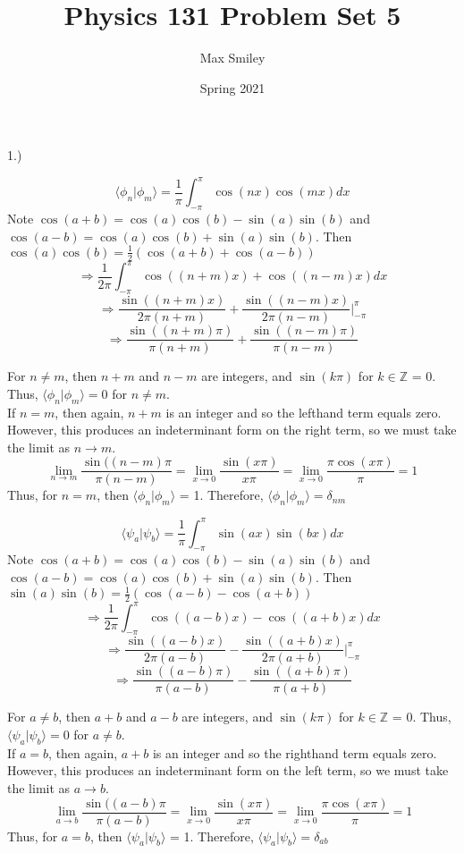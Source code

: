 \documentclass[12pt]{article}
\begin{document}
\title{Physics 131 Problem Set 5}
\author{Max Smiley}
\date{Spring 2021}
\maketitle

1.) 

$$\langle \phi_n | \phi_m \rangle = \frac{1}{\pi} \int_{-\pi}^{\pi} \cos(nx) \cos(mx) dx$$
Note $\cos(a + b) = \cos(a)\cos(b) - \sin(a)\sin(b)$ and $\cos(a - b) = \cos(a)\cos(b) + \sin(a)\sin(b)$. Then $\cos(a)\cos(b) = \frac{1}{2}(\cos(a + b) + \cos(a - b))$
$$\Rightarrow \frac{1}{2\pi} \int_{-\pi}^{\pi}\cos((n + m)x) + \cos((n - m)x)dx$$
$$\Rightarrow \frac{\sin((n + m)x)}{2\pi(n + m)} + \frac{\sin((n - m)x)}{2\pi(n - m)} \Big|_{-\pi}^{\pi}$$ 
$$\Rightarrow \frac{\sin((n + m)\pi)}{\pi (n + m)} + \frac{\sin((n - m)\pi)}{\pi (n - m)}$$

For $n \neq m$, then $n + m$ and $n - m$ are integers, and $\sin(k\pi)$ for $k \in \mathbb{Z}$ = 0. Thus, $\langle \phi_n | \phi_m \rangle = 0$ for $n \neq m$.\\

If $n = m$, then again, $n + m$ is an integer and so the lefthand term equals zero. However, this produces an indeterminant form on the right term, so we must take the limit as $n \rightarrow m$.
$$\lim_{n \rightarrow m} \frac{\sin((n - m) \pi}{\pi (n - m)} = \lim_{x \rightarrow 0} \frac{\sin(x\pi)}{x\pi} = \lim_{x \rightarrow 0} \frac{\pi \cos(x\pi)}{\pi} = 1$$
Thus, for $n = m$, then $\langle \phi_n | \phi_m \rangle$ = 1. Therefore, $\langle \phi_n | \phi_m \rangle = \delta_{nm}$

$$\langle \psi_a | \psi_b \rangle = \frac{1}{\pi} \int_{-\pi}^{\pi} \sin(ax) \sin(bx) dx$$
Note $\cos(a + b) = \cos(a)\cos(b) - \sin(a)\sin(b)$ and $\cos(a - b) = \cos(a)\cos(b) + \sin(a)\sin(b)$. Then $\sin(a)\sin(b) = \frac{1}{2}(\cos(a - b) - \cos(a + b))$
$$\Rightarrow \frac{1}{2\pi} \int_{-\pi}^{\pi}\cos((a - b)x) - \cos((a + b)x)dx$$
$$\Rightarrow \frac{\sin((a - b)x)}{2\pi(a - b)} - \frac{\sin((a + b)x)}{2\pi(a + b)} \Big|_{-\pi}^{\pi}$$ 
$$\Rightarrow \frac{\sin((a - b)\pi)}{\pi (a - b)} - \frac{\sin((a + b)\pi)}{\pi (a + b)}$$

For $a \neq b$, then $a + b$ and $a - b$ are integers, and $\sin(k\pi)$ for $k \in \mathbb{Z}$ = 0. Thus, $\langle \psi_a | \psi_b \rangle = 0$ for $a \neq b$.\\

If $a = b$, then again, $a + b$ is an integer and so the righthand term equals zero. However, this produces an indeterminant form on the left term, so we must take the limit as $a \rightarrow b$.
$$\lim_{a \rightarrow b} \frac{\sin((a - b) \pi}{\pi (a - b)} = \lim_{x \rightarrow 0} \frac{\sin(x\pi)}{x\pi} = \lim_{x \rightarrow 0} \frac{\pi \cos(x\pi)}{\pi} = 1$$
Thus, for $a = b$, then $\langle \psi_a | \psi_b \rangle$ = 1. Therefore, $\langle \psi_a | \psi_b \rangle = \delta_{ab}$
\end{document}
